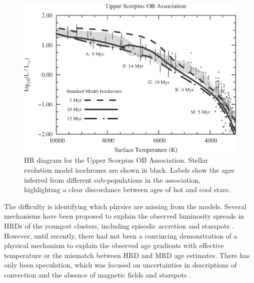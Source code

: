 \begin{figure}[t]
	\centering
	\includegraphics[width=0.65\columnwidth]{fig/USco_Age_Problems.eps}
	\caption{HR diagram for the Upper Scorpius OB Association. Stellar evolution model isochrones are shown in black. Labels show the ages inferred from different sub-populations in the association, highlighting a clear discordance between ages of hot and cool stars.}
	\label{fig:badhrd}
	\vspace{-0.2in}
\end{figure}

The difficulty is identifying which physics are missing from the models. Several mechanisms have been proposed to explain the observed luminosity spreads in HRDs of the youngest clusters, including episodic accretion \citep{Baraffe2009, Baraffe2010} and starspots \citep{Somers2015b}. However, until recently, there had not been a convincing demonstration of a physical mechanism to explain the observed age gradients with effective temperature or the mismatch between HRD and MRD age estimates. There has only been speculation, which was focused on uncertainties in descriptions of convection and the absence of magnetic fields and starspots \citep{Stassun2014, Soderblom2014, Herczeg2015}. 